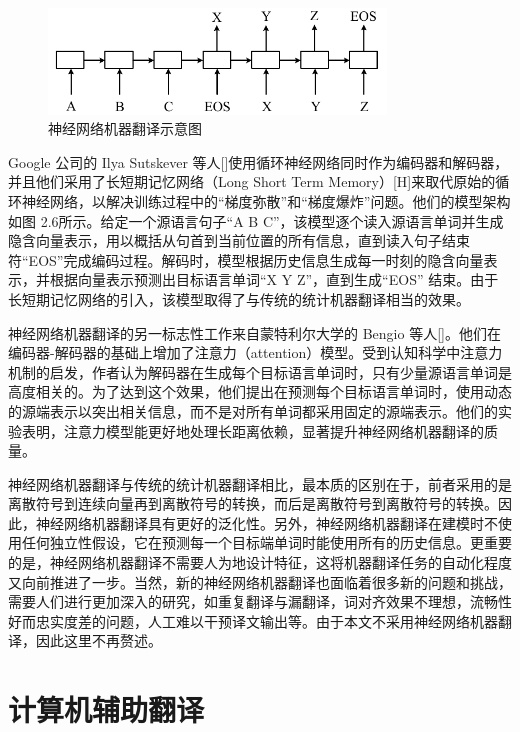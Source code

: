 \begin{figure}[tb]
	\centering
	\includegraphics[width=0.8\textwidth]{Figure/Figure_2_6.pdf}
	\caption{神经网络机器翻译示意图}
	\label{Fig_nmt}
\end{figure}

Google 公司的 Ilya Sutskever 等人[\cite{Sutskever:2014}]使用循环神经网络同时作为编码器和解码器，并且他们采用了长短期记忆网络（Long Short Term Memory）[H\cite{Hochreiter:1997}]来取代原始的循环神经网络，以解决训练过程中的“梯度弥散”和“梯度爆炸”问题。他们的模型架构如图 2.6所示。给定一个源语言句子“A B C”，该模型逐个读入源语言单词并生成隐含向量表示，用以概括从句首到当前位置的所有信息，直到读入句子结束符“EOS”完成编码过程。解码时，模型根据历史信息生成每一时刻的隐含向量表示，并根据向量表示预测出目标语言单词“X Y Z”，直到生成“EOS” 结束。由于长短期记忆网络的引入，该模型取得了与传统的统计机器翻译相当的效果。

神经网络机器翻译的另一标志性工作来自蒙特利尔大学的 Bengio 等人[\cite{Bahdanau:2015}]。他们在编码器-解码器的基础上增加了注意力（attention）模型。受到认知科学中注意力机制的启发，作者认为解码器在生成每个目标语言单词时，只有少量源语言单词是高度相关的。为了达到这个效果，他们提出在预测每个目标语言单词时，使用动态的源端表示以突出相关信息，而不是对所有单词都采用固定的源端表示。他们的实验表明，注意力模型能更好地处理长距离依赖，显著提升神经网络机器翻译的质量。

神经网络机器翻译与传统的统计机器翻译相比，最本质的区别在于，前者采用的是离散符号到连续向量再到离散符号的转换，而后是离散符号到离散符号的转换。因此，神经网络机器翻译具有更好的泛化性。另外，神经网络机器翻译在建模时不使用任何独立性假设，它在预测每一个目标端单词时能使用所有的历史信息。更重要的是，神经网络机器翻译不需要人为地设计特征，这将机器翻译任务的自动化程度又向前推进了一步。当然，新的神经网络机器翻译也面临着很多新的问题和挑战，需要人们进行更加深入的研究，如重复翻译与漏翻译，词对齐效果不理想，流畅性好而忠实度差的问题，人工难以干预译文输出等。由于本文不采用神经网络机器翻译，因此这里不再赘述。

\section{计算机辅助翻译}

